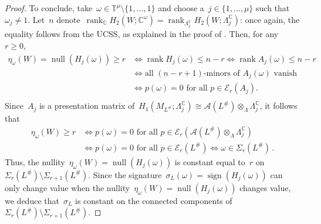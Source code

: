 \documentclass{amsart}
\newcommand{\C}{\mathbb{C}}
\newcommand{\T}{\mathbb{T}}
\newcommand{\A}{\mathcal{A}}
\newcommand{\sign}{\operatorname{sign}}
\newcommand{\nul}{\operatorname{null}}
\newcommand{\LambdaC}{\Lambda^{\mathbb{C}}}
\theoremstyle{definition}
\theoremstyle{remark}
\begin{document}
\begin{proof}
		To conclude, take~$\omega\in\T^\mu \setminus\{1,\dots,1\}$ and choose a~$j\in\{1,\dots,\mu\}$ such that~$\omega_j\neq 1$. Let~$n$ denote~$\operatorname{rank}_\mathbb{C}H_2(W;\C^\omega)=\operatorname{rank}_{\LambdaC_j}H_2(W;\LambdaC_j)$: once again, the equality follows from the UCSS, as explained in the proof of \cite[Lemma B.1]{CMP23}. Then, for any~$r\geq 0$,
		$$
		\begin{aligned}
			\eta_\omega(W) = \nul(H_j(\omega)) \geq r &\iff \operatorname{rank}H_j(\omega) \leq n-r \iff \operatorname{rank}A_j(\omega) \leq n-r\\
			&\iff \text{all } (n-r+1)\text{-minors of } A_j(\omega) \text{ vanish}\\
			&\iff p(\omega) = 0 \text{ for all }p\in \mathcal{E}_r(A_j).\\
		\end{aligned}$$
		Since~$A_j$ is a presentation matrix of~$H_1(M_{L^\#};\LambdaC_j)\cong \A({L^\#})\otimes_{\Lambda}\LambdaC_j$, it follows that 
		\begin{equation}
		\label{eq:eta}
		\begin{aligned}
		\eta_\omega(W)\geq r &\iff p(\omega) = 0 \text{ for all }p\in \mathcal{E}_r(\A({L^\#})\otimes_{\Lambda}\LambdaC_j)\\
		&\iff p(\omega) = 0 \text{ for all }p\in \mathcal{E}_r({L^\#})
		\iff\omega\in\Sigma_r({L^\#})\,.
		\end{aligned}
		\end{equation}
		Thus, the nullity~$\eta_\omega(W)=\nul(H_j(\omega))$ is constant equal to~$r$ on~$\Sigma_r({L^\#})\setminus\Sigma_{r+1}({L^\#})$. Since the
		signature~$\sigma_L(\omega)=\sign(H_j(\omega))$ can only change value when the
		nullity~$\eta_\omega(W)=\nul(H_j(\omega))$ changes value, we deduce that~$\sigma_L$ is constant on the connected components of~$\Sigma_r({L^\#})\setminus\Sigma_{r+1}({L^\#})$.
		

\end{proof}
\end{document}
